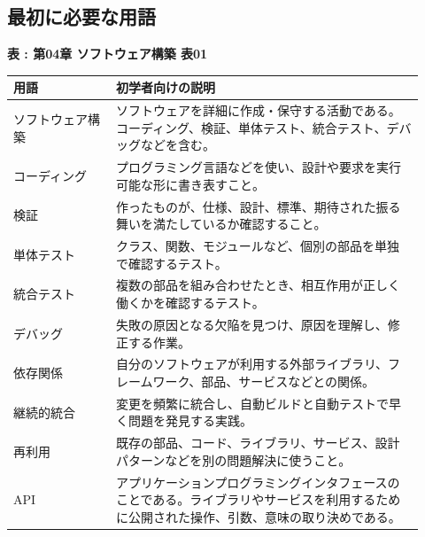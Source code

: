 \subsection*{最初に必要な用語}

\par\smallskip\noindent{}\label{tab:ch04-01}\textbf{表 \thetable: 第04章 ソフトウェア構築 表01}\par\smallskip
\begin{longtable}{L{0.23\linewidth}L{0.69\linewidth}}
\toprule
\textbf{用語} & \textbf{初学者向けの説明} \\
\midrule
ソフトウェア構築 & ソフトウェアを詳細に作成・保守する活動である。コーディング、検証、単体テスト、統合テスト、デバッグなどを含む。 \\
コーディング & プログラミング言語などを使い、設計や要求を実行可能な形に書き表すこと。 \\
検証 & 作ったものが、仕様、設計、標準、期待された振る舞いを満たしているか確認すること。 \\
単体テスト & クラス、関数、モジュールなど、個別の部品を単独で確認するテスト。 \\
統合テスト & 複数の部品を組み合わせたとき、相互作用が正しく働くかを確認するテスト。 \\
デバッグ & 失敗の原因となる欠陥を見つけ、原因を理解し、修正する作業。 \\
依存関係 & 自分のソフトウェアが利用する外部ライブラリ、フレームワーク、部品、サービスなどとの関係。 \\
継続的統合 & 変更を頻繁に統合し、自動ビルドと自動テストで早く問題を発見する実践。 \\
再利用 & 既存の部品、コード、ライブラリ、サービス、設計パターンなどを別の問題解決に使うこと。 \\
API & アプリケーションプログラミングインタフェースのことである。ライブラリやサービスを利用するために公開された操作、引数、意味の取り決めである。 \\
\bottomrule
\end{longtable}
